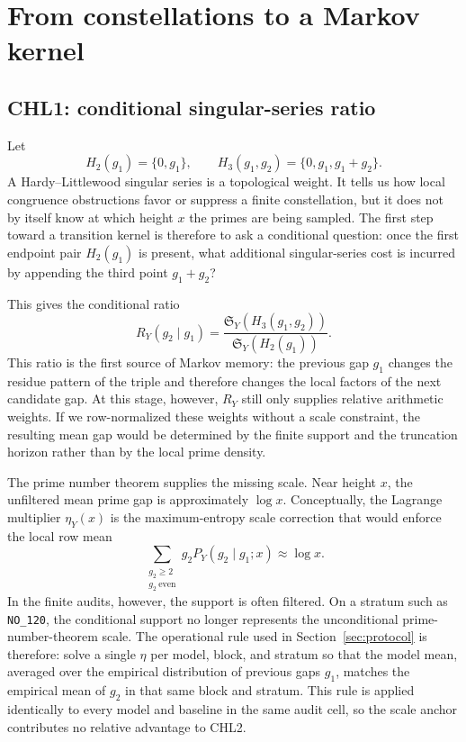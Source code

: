 \documentclass[10pt]{article}
\newcommand{\SY}{\mathfrak{S}_Y}
\begin{document}
\section{From constellations to a Markov kernel}\label{sec:chl-kernels}
\subsection{CHL1: conditional singular-series ratio}
Let
\[
H_2(g_1)=\{0,g_1\},\qquad H_3(g_1,g_2)=\{0,g_1,g_1+g_2\}.
\]
A Hardy--Littlewood singular series is a topological weight.  It tells us how local congruence obstructions favor or suppress a finite constellation, but it does not by itself know at which height $x$ the primes are being sampled.  The first step toward a transition kernel is therefore to ask a conditional question: once the first endpoint pair $H_2(g_1)$ is present, what additional singular-series cost is incurred by appending the third point $g_1+g_2$?

This gives the conditional ratio
\[
R_Y(g_2\mid g_1)=\frac{\SY(H_3(g_1,g_2))}{\SY(H_2(g_1))}.
\]
This ratio is the first source of Markov memory: the previous gap $g_1$ changes the residue pattern of the triple and therefore changes the local factors of the next candidate gap.  At this stage, however, $R_Y$ still only supplies relative arithmetic weights.  If we row-normalized these weights without a scale constraint, the resulting mean gap would be determined by the finite support and the truncation horizon rather than by the local prime density.

The prime number theorem supplies the missing scale.  Near height $x$, the unfiltered mean prime gap is approximately $\log x$.  Conceptually, the Lagrange multiplier $\eta_Y(x)$ is the maximum-entropy scale correction that would enforce the local row mean
\[
\sum_{\substack{g_2\ge2\\g_2\ \mathrm{even}}}g_2 P_Y(g_2\mid g_1;x)\approx \log x.
\]
In the finite audits, however, the support is often filtered.  On a stratum such as \texttt{NO\_120}, the conditional support no longer represents the unconditional prime-number-theorem scale.  The operational rule used in Section~\ref{sec:protocol} is therefore: solve a single $\eta$ per model, block, and stratum so that the model mean, averaged over the empirical distribution of previous gaps $g_1$, matches the empirical mean of $g_2$ in that same block and stratum.  This rule is applied identically to every model and baseline in the same audit cell, so the scale anchor contributes no relative advantage to CHL2.
\end{document}
